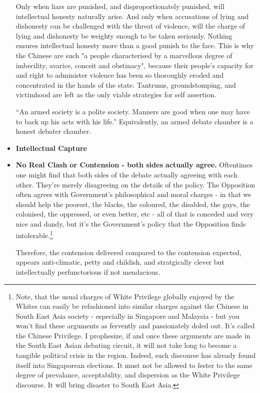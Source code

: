 \begin{itemize}
Only when liars are punished, and disproportionately punished, will intellectual honesty naturally arise. And only when accusations of lying and dishonesty can be challenged with the threat of violence, will the charge of lying and dishonesty be weighty enough to be taken seriously. Nothing ensures intellectual honesty more than a good punish to the face. This is why the Chinese are such "a people characterised by a marvellous degree of imbecility, avarice, conceit and obstinacy", because their people's capacity for and right to administer violence has been so thoroughly eroded and concentrated in the hands of the state. Tantrums, groundstomping, and victimhood are left as the only viable strategies for self assertion.

“An armed society is a polite society. Manners are good when one may have to back up his acts with his life.” Equivalently, an armed debate chamber is a honest debater chamber. 



\item \textbf{Intellectual Capture}

\item \textbf{No Real Clash or Contension - both sides actually agree.} Oftentimes one might find that both sides of the debate actually agreeing with each other. They're merely disagreeing on the details of the policy. The Opposition often agrees with Government's philosophical and moral charges - in that we should help the poorest, the blacks, the coloured, the disabled, the gays, the colonised, the oppressed, or even better, etc - all of that is conceded and very nice and dandy, but it's the Government's policy that the Opposition finds intolerable.\footnote{Note, that the usual charges of White Privilege globally enjoyed by the Whites can easily be refashioned into similar charges against the Chinese in South East Asia society - especially in Singapore and Malaysia - but you won't find these arguments as fervently and passionately doled out. It's called the Chinese Privilege. I prophesize, if and once these arguments are made in the South East Asian debating circuit, it will not take long to become a tangible political crisis in the region. Indeed, such discourse has already found itself into Singaporean elections. It must not be allowed to fester to the same degree of prevalance, acceptability, and dispersion as the White Privilege discourse. It will bring disaster to South East Asia.}
    
    Therefore, the contension delivered compared to the contension expected, appears anti-climatic, petty and childish, and stratgically clever but intellectually perfunctorious if not mendacious.  


\end{itemize}
